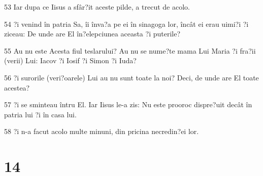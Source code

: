 \par 53 Iar dupa ce Iisus a sfâr?it aceste pilde, a trecut de acolo.
\par 54 ?i venind în patria Sa, îi înva?a pe ei în sinagoga lor, încât ei erau uimi?i ?i ziceau: De unde are El în?elepciunea aceasta ?i puterile?
\par 55 Au nu este Acesta fiul teslarului? Au nu se nume?te mama Lui Maria ?i fra?ii (verii) Lui: Iacov ?i Iosif ?i Simon ?i Iuda?
\par 56 ?i surorile (veri?oarele) Lui au nu sunt toate la noi? Deci, de unde are El toate acestea?
\par 57 ?i se sminteau întru El. Iar Iisus le-a zis: Nu este prooroc dispre?uit decât în patria lui ?i în casa lui.
\par 58 ?i n-a facut acolo multe minuni, din pricina necredin?ei lor.

\chapter{14}

